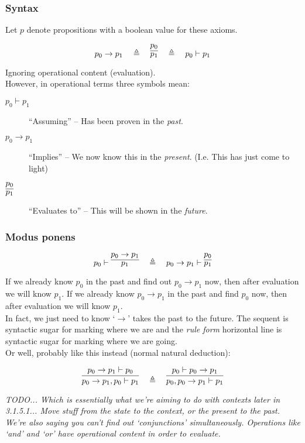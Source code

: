 \documentclass[a4paper,11pt]{article}
\begin{document}
{\color{gray}
\subsubsection{Syntax}

Let $p$ denote propositions with a boolean value for these axioms.

\[
p_0 \rightarrow p_1 \quad \triangleq \quad \infer{p_1}{p_0} \quad \triangleq \quad p_0 \vdash p_1
\]

Ignoring operational content (evaluation).\\

However, in operational terms three symbols mean:
\begin{description}
  \item[$p_0 \vdash p_1$] ``Assuming'' -- Has been proven in the \emph{past}.
  \item[$p_0 \rightarrow p_1$] ``Implies'' -- We now know this in the \emph{present}. (I.e. This has just come to light)
  \item[$\infer{p_1}{p_0}$] ``Evaluates to'' -- This will be shown in the \emph{future}.
\end{description}

\subsubsection{Modus ponens}

\[
p_0 \vdash \infer{p_1}{p_0 \rightarrow p_1} \quad \triangleq \quad p_0 \rightarrow p_1 \vdash \infer{p_1}{p_0}
\]

If we already know $p_0$ in the past and find out $p_0 \rightarrow p_1$ now, then after evaluation we will know $p_1$.
If we already know $p_0 \rightarrow p_1$ in the past and find $p_0$ now, then after evaluation we will know $p_1$.\\

In fact, we just need to know `$\rightarrow$' takes the past to the future.
The sequent is syntactic sugar for marking where we are and the \emph{rule form} horizontal line is syntactic sugar for marking where we are going.\\

Or well, probably like this instead (normal natural deduction):

\[ 
\infer{p_0 \rightarrow p_1, p_0 \vdash p_1}{p_0 \rightarrow p_1 \vdash p_0} \quad \triangleq \quad \infer{p_0, p_0 \rightarrow p_1 \vdash p_1}{p_0 \vdash p_0 \rightarrow p_1}
\]

\emph{TODO... Which is essentially what we're aiming to do with contexts later in 3.1.5.1... Move stuff from the state to the context, or the present to the past. We're also saying you can't find out `conjunctions' simultaneously. Operations like `and' and `or' have operational content in order to evaluate.}
}
\end{document}
